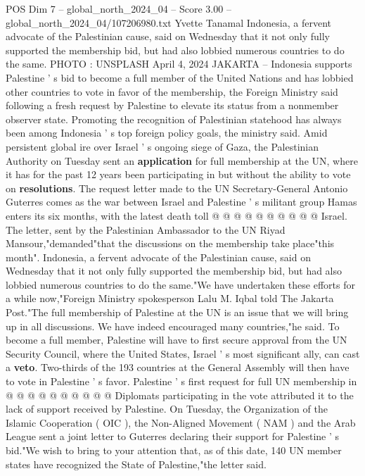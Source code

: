 \begin{textsample}{POS Dim 7 – global\_north\_2024\_04 – Score 3.00 – global\_north\_2024\_04/107206980.txt}  \label{ex:f7_pos_228}
Yvette Tanamal Indonesia, a fervent advocate of the Palestinian cause, said on Wednesday that it not only fully supported the membership bid, but had also lobbied numerous countries to do the same.
PHOTO : UNSPLASH April 4, 2024 JAKARTA -- Indonesia supports Palestine ' s bid to become a full member of the United Nations and has lobbied other countries to vote in favor of the membership, the Foreign Ministry said following a fresh request by Palestine to elevate its status from a nonmember observer state.
Promoting the recognition of Palestinian statehood has always been among Indonesia ' s top foreign policy goals, the ministry said.
Amid persistent global ire over Israel ' s ongoing siege of Gaza, the Palestinian Authority on Tuesday sent an \textbf{application} for full membership at the UN, where it has for the past 12 years been participating in but without the ability to vote on \textbf{resolutions}.
The request letter made to the UN Secretary-General Antonio Guterres comes as the war between Israel and Palestine ' s militant group Hamas enters its six months, with the latest death toll @ @ @ @ @ @ @ @ @ @ Israel.
The letter, sent by the Palestinian Ambassador to the UN Riyad Mansour,"demanded"that the discussions on the membership take place"this month".
Indonesia, a fervent advocate of the Palestinian cause, said on Wednesday that it not only fully supported the membership bid, but had also lobbied numerous countries to do the same."We have undertaken these efforts for a while now,"Foreign Ministry spokesperson Lalu M.
Iqbal told The Jakarta Post."The full membership of Palestine at the UN is an issue that we will bring up in all discussions.
We have indeed encouraged many countries,"he said.
To become a full member, Palestine will have to first secure approval from the UN Security Council, where the United States, Israel ' s most significant ally, can cast a \textbf{veto}.
Two-thirds of the 193 countries at the General Assembly will then have to vote in Palestine ' s favor.
Palestine ' s first request for full UN membership in @ @ @ @ @ @ @ @ @ @ Diplomats participating in the vote attributed it to the lack of support received by Palestine.
On Tuesday, the Organization of the Islamic Cooperation ( OIC ), the Non-Aligned Movement ( NAM ) and the Arab League sent a joint letter to Guterres declaring their support for Palestine ' s bid."We wish to bring to your attention that, as of this date, 140 UN member states have recognized the State of Palestine,"the letter said.

\end{textsample}
